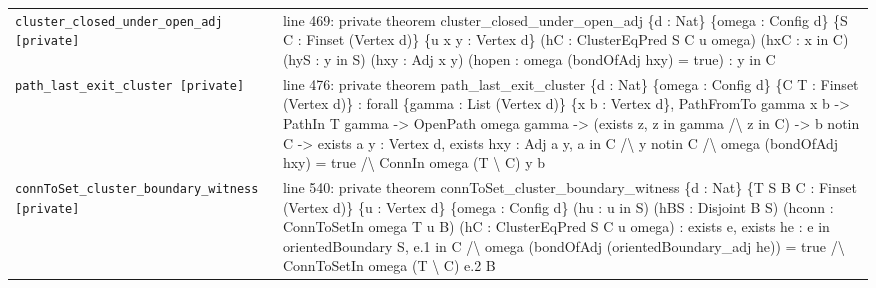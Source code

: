 \documentclass[10pt]{article}
\begin{document}
\begin{longtable}{>{\raggedright\arraybackslash}p{} >{\raggedright\arraybackslash}p{}}
\texttt{cluster\_\allowbreak{}closed\_\allowbreak{}under\_\allowbreak{}open\_\allowbreak{}adj [private]} & {\ttfamily\scriptsize line 469:\allowbreak{} private theorem cluster\_\allowbreak{}closed\_\allowbreak{}under\_\allowbreak{}open\_\allowbreak{}adj \{d :\allowbreak{} Nat\} \{omega :\allowbreak{} Config d\} \{S C :\allowbreak{} Finset (\allowbreak{}Vertex d)\allowbreak{}\} \{u x y :\allowbreak{} Vertex d\} (\allowbreak{}hC :\allowbreak{} ClusterEqPred S C u omega)\allowbreak{} (\allowbreak{}hxC :\allowbreak{} x in C)\allowbreak{} (\allowbreak{}hyS :\allowbreak{} y in S)\allowbreak{} (\allowbreak{}hxy :\allowbreak{} Adj x y)\allowbreak{} (\allowbreak{}hopen :\allowbreak{} omega (\allowbreak{}bondOfAdj hxy)\allowbreak{} =\allowbreak{} true)\allowbreak{} :\allowbreak{} y in C} \\[0.45em]
\texttt{path\_\allowbreak{}last\_\allowbreak{}exit\_\allowbreak{}cluster [private]} & {\ttfamily\scriptsize line 476:\allowbreak{} private theorem path\_\allowbreak{}last\_\allowbreak{}exit\_\allowbreak{}cluster \{d :\allowbreak{} Nat\} \{omega :\allowbreak{} Config d\} \{C T :\allowbreak{} Finset (\allowbreak{}Vertex d)\allowbreak{}\} :\allowbreak{} forall \{gamma :\allowbreak{} List (\allowbreak{}Vertex d)\allowbreak{}\} \{x b :\allowbreak{} Vertex d\},\allowbreak{} PathFromTo gamma x b -\allowbreak{}> PathIn T gamma -\allowbreak{}> OpenPath omega gamma -\allowbreak{}> (\allowbreak{}exists z,\allowbreak{} z in gamma /\allowbreak{}\textbackslash{} z in C)\allowbreak{} -\allowbreak{}> b notin C -\allowbreak{}> exists a y :\allowbreak{} Vertex d,\allowbreak{} exists hxy :\allowbreak{} Adj a y,\allowbreak{} a in C /\allowbreak{}\textbackslash{} y notin C /\allowbreak{}\textbackslash{} omega (\allowbreak{}bondOfAdj hxy)\allowbreak{} =\allowbreak{} true /\allowbreak{}\textbackslash{} ConnIn omega (\allowbreak{}T \textbackslash{} C)\allowbreak{} y b} \\[0.45em]
\texttt{connToSet\_\allowbreak{}cluster\_\allowbreak{}boundary\_\allowbreak{}witness [private]} & {\ttfamily\scriptsize line 540:\allowbreak{} private theorem connToSet\_\allowbreak{}cluster\_\allowbreak{}boundary\_\allowbreak{}witness \{d :\allowbreak{} Nat\} \{T S B C :\allowbreak{} Finset (\allowbreak{}Vertex d)\allowbreak{}\} \{u :\allowbreak{} Vertex d\} \{omega :\allowbreak{} Config d\} (\allowbreak{}hu :\allowbreak{} u in S)\allowbreak{} (\allowbreak{}hBS :\allowbreak{} Disjoint B S)\allowbreak{} (\allowbreak{}hconn :\allowbreak{} ConnToSetIn omega T u B)\allowbreak{} (\allowbreak{}hC :\allowbreak{} ClusterEqPred S C u omega)\allowbreak{} :\allowbreak{} exists e,\allowbreak{} exists he :\allowbreak{} e in orientedBoundary S,\allowbreak{} e.\allowbreak{}1 in C /\allowbreak{}\textbackslash{} omega (\allowbreak{}bondOfAdj (\allowbreak{}orientedBoundary\_\allowbreak{}adj he)\allowbreak{})\allowbreak{} =\allowbreak{} true /\allowbreak{}\textbackslash{} ConnToSetIn omega (\allowbreak{}T \textbackslash{} C)\allowbreak{} e.\allowbreak{}2 B} \\[0.45em]

\end{longtable}
\end{document}
